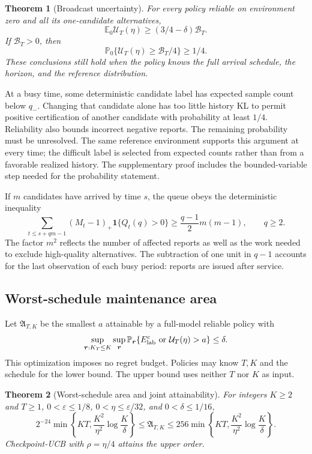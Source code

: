 \documentclass[11pt]{article}
\newtheorem{theorem}{Theorem}[section]
\theoremstyle{remark}
\newcommand{\E}{\mathbb E}
\newcommand{\Prob}{\mathbb P}
\newcommand{\ind}{\mathbf 1}
\begin{document}
\begin{theorem}[Broadcast uncertainty]
\label{thm:broadcast}
For every policy reliable on environment zero and all its one-candidate
alternatives,
\[
 \E_0\mathcal U_T(\eta)\ge(3/4-\delta)\mathcal B_T.
\]
If $\mathcal B_T>0$, then
\[
 \Prob_0\{\mathcal U_T(\eta)\ge\mathcal B_T/4\}\ge1/4.
\]
These conclusions still hold when the policy knows the full arrival schedule,
the horizon, and the reference distribution.
\end{theorem}

At a busy time, some deterministic candidate label has expected sample count
below $q_-$. Changing that candidate alone has too little history KL to permit
positive certification of another candidate with probability at least $1/4$.
Reliability also bounds incorrect negative reports. The remaining probability
must be unresolved. The same reference environment supports this argument at
every time; the difficult label is selected from expected counts rather than
from a favorable realized history. The supplementary proof includes the
bounded-variable step needed for the probability statement.

If $m$ candidates have arrived by time $s$, the queue obeys the deterministic
inequality
\begin{equation}
 \sum_{t\le s+qm-1}(M_t-1)_+\ind\{Q_t(q)>0\}
                  \ge\frac{q-1}{2}m(m-1),\qquad q\ge2.
 \label{eq:queue_area}
\end{equation}
The factor $m^2$ reflects the number of affected reports as well as the work
needed to exclude high-quality alternatives. The subtraction of one unit in
$q-1$ accounts for the last observation of each busy period: reports are issued
after service.

\subsection{Worst-schedule maintenance area}

Let $\mathfrak A_{T,K}$ be the smallest $a$ attainable by a full-model reliable
policy with
\[
 \sup_{\boldsymbol\tau:K_T\le K}\sup_{\boldsymbol r}
 \Prob_{\boldsymbol r}\{E_{\rm lab}^c\ \text{or}\ \mathcal U_T(\eta)>a\}\le\delta.
\]
This optimization imposes no regret budget. Policies may know $T,K$ and the
schedule for the lower bound. The upper bound uses neither $T$ nor $K$ as
input.

\begin{theorem}[Worst-schedule area and joint attainability]
\label{thm:worst_area}
For integers $K\ge2$ and $T\ge1$, $0<\varepsilon\le1/8$,
$0<\eta\le\varepsilon/32$, and $0<\delta\le1/16$,
\begin{equation}
 2^{-24}\min\left\{KT,\frac{K^2}{\eta^2}\log\frac K\delta\right\}
 \le\mathfrak A_{T,K}\le
 256\min\left\{KT,\frac{K^2}{\eta^2}\log\frac K\delta\right\}.
 \label{eq:worst_area}
\end{equation}
Checkpoint-UCB with $\rho=\eta/4$ attains the upper order.
\end{theorem}
\end{document}
